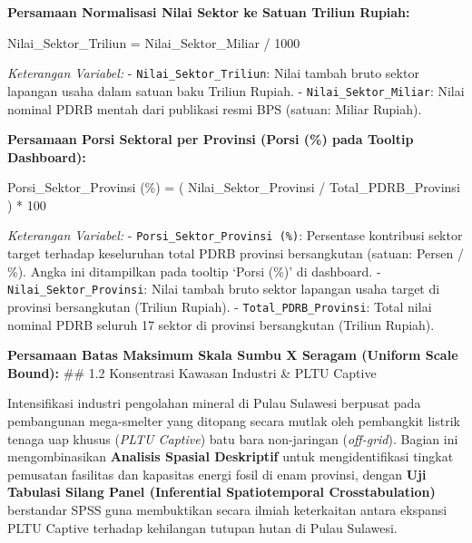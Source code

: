 \documentclass[
]{article}
\newenvironment{Shaded}{}{}
\newcommand{\NormalTok}[1]{#1}
\begin{document}
\textbf{Persamaan Normalisasi Nilai Sektor ke Satuan Triliun Rupiah:}

\begin{Shaded}
\begin{Highlighting}[]
\NormalTok{Nilai\_Sektor\_Triliun = Nilai\_Sektor\_Miliar / 1000}
\end{Highlighting}
\end{Shaded}

\emph{Keterangan Variabel:} - \texttt{Nilai\_Sektor\_Triliun}: Nilai
tambah bruto sektor lapangan usaha dalam satuan baku Triliun Rupiah. -
\texttt{Nilai\_Sektor\_Miliar}: Nilai nominal PDRB mentah dari publikasi
resmi BPS (satuan: Miliar Rupiah).

\textbf{Persamaan Porsi Sektoral per Provinsi (Porsi (\%) pada Tooltip
Dashboard):}

\begin{Shaded}
\begin{Highlighting}[]
\NormalTok{Porsi\_Sektor\_Provinsi (\%) = ( Nilai\_Sektor\_Provinsi / Total\_PDRB\_Provinsi ) * 100}
\end{Highlighting}
\end{Shaded}

\emph{Keterangan Variabel:} - \texttt{Porsi\_Sektor\_Provinsi\ (\%)}:
Persentase kontribusi sektor target terhadap keseluruhan total PDRB
provinsi bersangkutan (satuan: Persen / \%). Angka ini ditampilkan pada
tooltip `Porsi (\%)' di dashboard. - \texttt{Nilai\_Sektor\_Provinsi}:
Nilai tambah bruto sektor lapangan usaha target di provinsi bersangkutan
(Triliun Rupiah). - \texttt{Total\_PDRB\_Provinsi}: Total nilai nominal
PDRB seluruh 17 sektor di provinsi bersangkutan (Triliun Rupiah).

\textbf{Persamaan Batas Maksimum Skala Sumbu X Seragam (Uniform Scale
Bound):} \#\# 1.2 Konsentrasi Kawasan Industri \& PLTU Captive

Intensifikasi industri pengolahan mineral di Pulau Sulawesi berpusat
pada pembangunan mega-smelter yang ditopang secara mutlak oleh
pembangkit listrik tenaga uap khusus (\emph{PLTU Captive}) batu bara
non-jaringan (\emph{off-grid}). Bagian ini mengombinasikan
\textbf{Analisis Spasial Deskriptif} untuk mengidentifikasi tingkat
pemusatan fasilitas dan kapasitas energi fosil di enam provinsi, dengan
\textbf{Uji Tabulasi Silang Panel (Inferential Spatiotemporal
Crosstabulation)} berstandar SPSS guna membuktikan secara ilmiah
keterkaitan antara ekspansi PLTU Captive terhadap kehilangan tutupan
hutan di Pulau Sulawesi.
\end{document}
